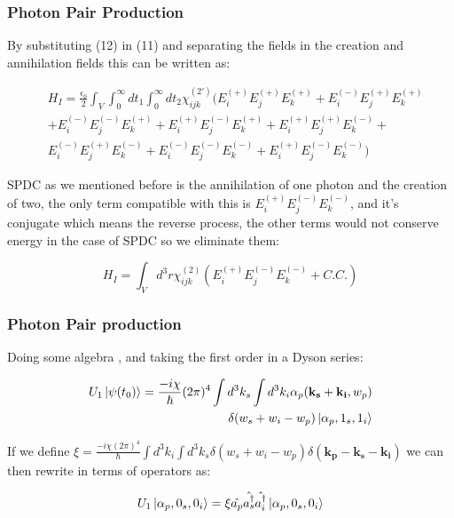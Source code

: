 \documentclass[]{beamer}
\begin{document}
\begin{frame}
\frametitle{Photon Pair Production}
By substituting (12) in (11) and separating the fields in the creation and annihilation fields this can be written as:

\begin{align*}
& H_{I}=\frac{\epsilon_{0}}{2} \int_{V}\int_{0}^{\infty}dt_{1}\int_{0}^{\infty}dt_{2} \chi_{ijk}^{(2')}(E_{i}^{(+)}E_{j}^{(+)}E_{k}^{(+)}+E_{i}^{(-)}E_{j}^{(+)}E_{k}^{(+)}\\
& +E_{i}^{(-)}E_{j}^{(-)}E_{k}^{(+)}+E_{i}^{(+)}E_{j}^{(-)}E_{k}^{(+)}+E_{i}^{(+)}E_{j}^{(+)}E_{k}^{(-)}+\\
& E_{i}^{(-)}E_{j}^{(+)}E_{k}^{(-)}+E_{i}^{(-)}E_{j}^{(-)}E_{k}^{(-)}+E_{i}^{(+)}E_{j}^{(-)}E_{k}^{(-)}) 
\end{align*}

SPDC as we mentioned before is the annihilation of one photon and the creation of two, the only term compatible with this is $E_{i}^{(+)}E_{j}^{(-)}E_{k}^{(-)}$, and it's conjugate which means the reverse process, the other terms would not conserve energy in the case of SPDC so we eliminate them:

\begin{equation}
H_{I}=\int_{V} d^{3}r \chi_{ijk}^{(2)} (E_{i}^{(+)}E_{j}^{(-)}E_{k}^{(-)}+C.C.)
\end{equation}

\end{frame}

\begin{frame}
\frametitle{Photon Pair production}


Doing some algebra , and taking the first order in a Dyson series:

\begin{align*}
U_{1}\ket{\psi(t_{0})}=\frac{-i\chi}{\hbar} (2 \pi)^{4} \int d^{3}k_{s}\int d^{3}k_{i} \alpha_{p}(\mathbf{k_{s}}+\mathbf{k_{i}},w_{p})\\
\delta(w_{s}+w_{i}-w_{p})\ket{\alpha_{p},1_{s},1_{i}}
\end{align*}

If we define $\xi=\frac{-i\chi(2 \pi)^{4}}{\hbar} \int d^{3}k_{i} \int d^{3}k_{s}\delta(w_{s}+w_{i}-w_{p}) \delta(\mathbf{k_{p}}-\mathbf{k_{s}}-\mathbf{k_{i}})$ we can then rewrite in terms of operators as:

\begin{equation}
U_{1}\ket{\alpha_{p},0_{s},0_{i}}=\xi \hat{a_{p}}\hat{a_{s}^{\dagger}}\hat{a_{i}^{\dagger}}\ket{\alpha_{p},0_{s},0_{i}}
\end{equation}

\end{frame}
\end{document}
